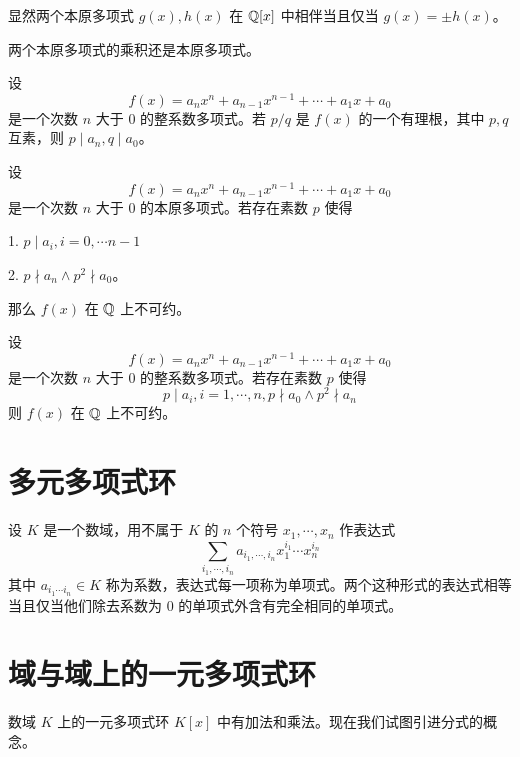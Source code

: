 显然两个本原多项式 $g(x), h(x)$ 在 $\mathbb{Q}[x]$ 中相伴当且仅当 $g(x) = \pm h(x)$。

\begin{theorem}[Gauss 引理]
    两个本原多项式的乘积还是本原多项式。
\end{theorem}

\begin{theorem}
    设
    \[ f(x) = a_nx^n + a_{n-1}x^{n-1} + \cdots + a_1x + a_0\]
    是一个次数 $n$ 大于 $0$ 的整系数多项式。若 $p/q$ 是 $f(x)$ 的一个有理根，其中 $p,q$ 互素，则 $p \mid a_n, q \mid a_0$。
\end{theorem}

\begin{theorem}
    设
    \[ f(x) = a_nx^n + a_{n-1}x^{n-1} + \cdots + a_1x + a_0\]
    是一个次数 $n$ 大于 $0$ 的本原多项式。若存在素数 $p$ 使得

    1. $p \mid a_i, i = 0,\cdots n-1$

    2. $p \nmid a_n \land p^2 \nmid a_0$。

    那么 $f(x)$ 在 $\mathbb{Q}$ 上不可约。
\end{theorem}

\begin{theorem}
    设
    \[ f(x) = a_nx^n + a_{n-1}x^{n-1} + \cdots + a_1x + a_0\]
    是一个次数 $n$ 大于 $0$ 的整系数多项式。若存在素数 $p$ 使得
    \[ p \mid a_i, i = 1,\cdots,n, p \nmid a_0 \land  p^2 \nmid a_n \]
    则 $f(x)$ 在 $\mathbb{Q}$ 上不可约。
\end{theorem}

\section{多元多项式环}

\begin{definition}
    设 $K$ 是一个数域，用不属于 $K$ 的 $n$ 个符号 $x_1,\cdots,x_n$ 作表达式
    \[ \sum_{i_1,\cdots,i_n}a_{i_1,\cdots,i_n} x_1^{i_1}\cdots x_n^{i_n} \]
    其中 $a_{i_1\cdots i_n} \in K$ 称为系数，表达式每一项称为单项式。两个这种形式的表达式相等当且仅当他们除去系数为 $0$ 的单项式外含有完全相同的单项式。
\end{definition}

\section{域与域上的一元多项式环}

数域 $K$ 上的一元多项式环 $K[x]$ 中有加法和乘法。现在我们试图引进分式的概念。

